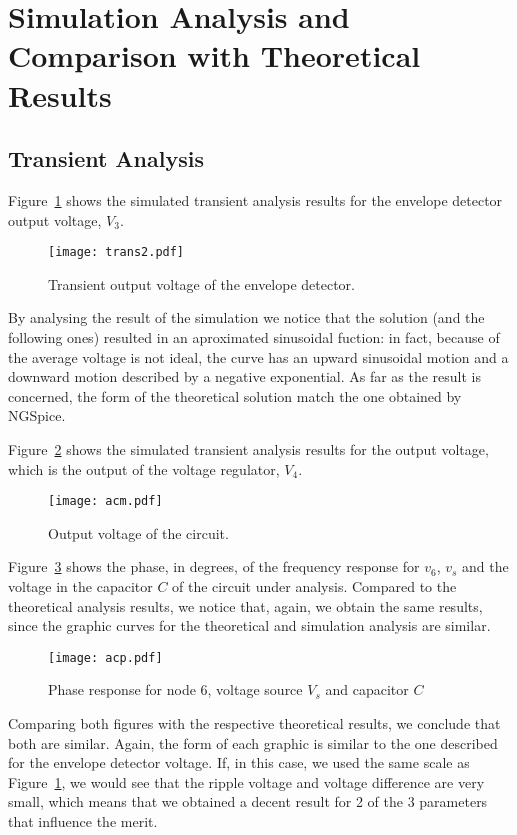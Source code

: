 \section{Simulation Analysis and Comparison with Theoretical Results}
\label{sec:simulation}

\subsection{Transient Analysis}


Figure~\ref{fig:trans2} shows the simulated transient analysis results for the
envelope detector output voltage, $V_3$.

\begin{figure}[H] \centering
\texttt{[image: trans2.pdf]}
\caption{Transient output voltage of the envelope detector.}
\label{fig:trans2}
\end{figure}

By analysing the result of the simulation we notice that the solution (and the following ones) 
resulted in an aproximated sinusoidal fuction: in fact, because of the average voltage is not ideal,
the curve has an upward sinusoidal motion and a downward motion described by a negative exponential.  
As far as the result is concerned, the form of the theoretical solution match the one obtained by NGSpice.


Figure~\ref{fig:acm} shows the simulated transient analysis results for the output voltage, which is the output of the
voltage regulator, $V_4$.

\begin{figure}[H] \centering
\texttt{[image: acm.pdf]}
\caption{Output voltage of the circuit.}
\label{fig:acm}
\end{figure}

Figure~\ref{fig:acp} shows the phase, in degrees, of the frequency response for $v_6$, $v_s$ and the voltage in the capacitor $C$ 
of the circuit under analysis. Compared to the theoretical analysis results, we notice that, again, we obtain the same results, 
since the graphic curves for the theoretical and simulation analysis are similar.

\begin{figure}[H] \centering
\texttt{[image: acp.pdf]}
\caption{Phase response for node 6, voltage source $V_s$ and capacitor $C$}
\label{fig:acp}
\end{figure}


	Comparing both figures with the respective theoretical results, we conclude that both are similar. Again, the form of each graphic
	is similar to the one described for the envelope detector voltage. If, in this case, we used the same scale as Figure~\ref{fig:trans2},
	we would see that the ripple voltage and voltage difference are very small, which means that we obtained a decent result for 2 of the 3
	parameters that influence the merit.



